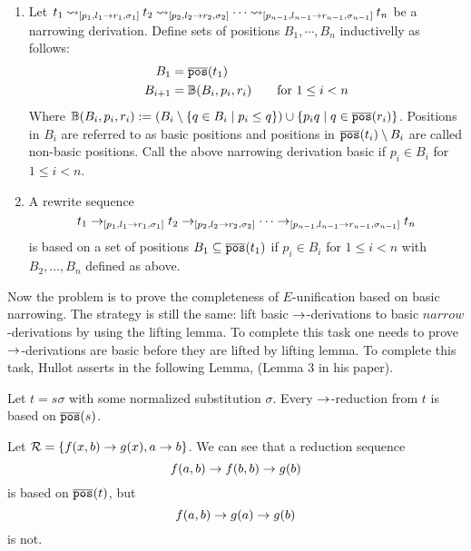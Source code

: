 \begin{definition}
	\begin{enumerate}
		\item Let $t_1 \mathbin{\rightsquigarrow}_{[p_1, l_1 \rightarrow r_1, \sigma_1]} t_2 \mathbin{\rightsquigarrow}_{[p_2, l_2 \rightarrow r_2, \sigma_2]} \cdots \mathbin{\rightsquigarrow}_{[p_{n-1}, l_{n-1} \rightarrow r_{n-1}, \sigma_{n-1}]} t_n$ be a narrowing derivation. Define sets of positions $B_1, \cdots, B_n$ inductivelly as follows:
		      \begin{align*}
			      B_1     & = \overline{\mathtt{pos}}(t_1)                                            \\
			      B_{i+1} & = \mathbb{B}(B_i, p_i, r_i) \qquad \text{for } 1 \leq i < n
		      \end{align*}
		      Where $\mathbb{B}(B_i, p_i, r_i) := (B_i \setminus \{ q \in B_i \mid p_i \leq q \}) \cup \{ p_iq \mid q \in \overline{\mathtt{pos}}(r_i) \}$. Positions in $B_i$ are referred to as basic positions and positions in $\overline{\mathtt{pos}}(t_i) \setminus B_i$ are called non-basic positions. Call the above narrowing derivation basic if $p_i \in B_i$ for $1 \leq i < n$.
		\item A rewrite sequence
		      $$t_1 \rightarrow_{[p_1, l_1 \rightarrow r_1, \sigma_1]} t_2 \rightarrow_{[p_2, l_2 \rightarrow r_2, \sigma_2]} \cdots \rightarrow_{[p_{n-1}, l_{n-1} \rightarrow r_{n-1}, \sigma_{n-1}]} t_n$$
		      is based on a set of positions $B_1 \subseteq \overline{\mathtt{pos}}(t_1)$ if $p_i \in B_i$ for $1 \leq i < n$ with $B_2, \dots, B_n$ defined as above.
	\end{enumerate}
\end{definition}

Now the problem is to prove the completeness of $E$-unification based on basic narrowing. The strategy is still the same: lift basic $\rightarrow$-derivations to basic $narrow$-derivations by using the lifting lemma. To complete this task one needs to prove $\rightarrow$-derivations are basic before they are lifted by lifting lemma. To complete this task, Hullot asserts in \cite{hullot:cfunif} the following Lemma, (Lemma 3 in his paper).

\begin{lemma}
	Let $t = s\sigma$ with some normalized substitution $\sigma$. Every $\rightarrow$-reduction from $t$ is based on $\overline{\mathtt{pos}}(s)$.
\end{lemma}

\begin{example}\label{example:hullot-counter-ex}
	Let $\mathcal{R} = \{ f(x,b) \rightarrow g(x), a \rightarrow b \}$. We can see that a reduction sequence
	$$f(a,b) \rightarrow f(b,b) \rightarrow g(b)$$
	is based on $\overline{\mathtt{pos}}(t)$, but
	$$f(a,b) \rightarrow g(a) \rightarrow g(b)$$
	is not.
\end{example}

